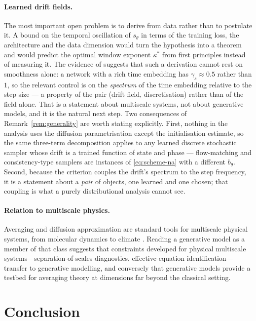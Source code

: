 \documentclass[a4paper,fleqn]{cas-dc}
\theoremstyle{definition}
\begin{document}
\paragraph{Learned drift fields.}
The most important open problem is to derive  from data rather than to
postulate it. A bound on the temporal oscillation of $s_{\theta}$ in terms of the
training loss, the architecture and the data dimension would turn the hypothesis into a
theorem and would predict the optimal window exponent $\kappa^{*}$ from first
principles instead of measuring it. The evidence of  suggests that
such a derivation cannot rest on smoothness alone: a network with a rich time embedding
has $\gamma_{s}\approx0.5$ rather than $1$, so the relevant control is on the
\emph{spectrum} of the time embedding relative to the step size --- a property of the
pair (drift field, discretisation) rather than of the field alone. That is a statement
about multiscale systems, not about generative models, and it is the natural next step.
Two consequences of Remark~\ref{rem:generality} are worth stating explicitly. First, nothing in
the analysis uses the diffusion parametrisation except the initialisation estimate, so
the same three-term decomposition applies to any learned discrete stochastic sampler
whose drift is a trained function of state and phase --- flow-matching and
consistency-type samplers are instances of \eqref{eq:scheme-na} with a different
$b_{\theta}$. Second, because the criterion couples the drift's spectrum to the step
frequency, it is a statement about a \emph{pair} of objects, one learned and one chosen;
that coupling is what a purely distributional analysis cannot see.

\paragraph{Relation to multiscale physics.}
Averaging and diffusion approximation are standard tools for multiscale physical
systems, from molecular dynamics to climate \citep{pavliotis2008,givon2004}. Reading
a generative model as a member of that class suggests that constraints developed for
physical multiscale systems---separation-of-scales diagnostics, effective-equation
identification---transfer to generative modelling, and conversely that generative
models provide a testbed for averaging theory at dimensions far beyond the classical
setting.

\section{Conclusion}
\label{sec:conclusion}
\end{document}
